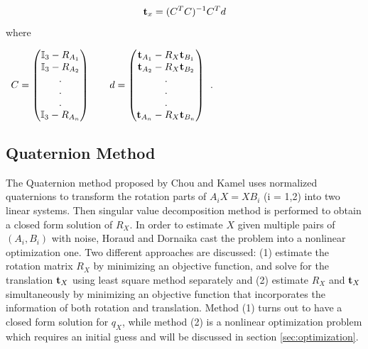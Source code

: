 \documentclass[twocolumn,10pt]{asme2ej}
\newcommand{\ttt}{{\bf t}}
\begin{document}
\begin{equation}
\ttt_{x} = (C^{T}C)^{-1}C^{T}d
\label{t_least}
\end{equation}
where\\

\begin{center}
$\begin{array}{lr}
C = \begin{pmatrix}
\mathbb{I}_{3} - R_{{A_{1}}}\\
\mathbb{I}_{3} - R_{{A_{2}}}\\
.\\
.\\
.\\
\mathbb{I}_{3} - R_{{A_{n}}}\\
\end{pmatrix}
\; \; 
& \; \;
d = \begin{pmatrix}
\ttt_{A_{1}} - R_{X}\ttt_{B_{1}}\\
\ttt_{A_{2}} - R_{X}\ttt_{B_{2}}\\.\\
.\\
.\\
\ttt_{A_{n}} - R_{X}\ttt_{B_{n}}\\\end{pmatrix} 
\end{array}$.
\end{center}


\subsection{Quaternion Method }
The Quaternion method proposed by Chou  and Kamel \cite{chou1988quaternions,chou1991finding} uses normalized quaternions to transform the rotation parts of $A_{i}X = XB_{i}$ (i = 1,2) into two linear systems. Then singular value decomposition method is performed to obtain a closed form solution of $R_{X}$. In order to estimate $X$ given multiple pairs of $(A_{i}, B_{i})$ with noise, Horaud and Dornaika \cite{horaud1995hand} cast the problem into a nonlinear optimization one. Two different approaches are discussed: (1) estimate the rotation matrix $R_{X}$ by minimizing an objective function, and solve for the translation $\ttt_{X}$ using least square method separately and (2) estimate $R_{X}$ and $\ttt_{X}$ simultaneously by minimizing an objective function that incorporates the information of both rotation and translation. Method (1) turns out to have a closed form solution for $q_{X}$, while method (2) is a nonlinear optimization problem which requires an initial guess and will be discussed in section \ref{sec:optimization}. 
\end{document}
